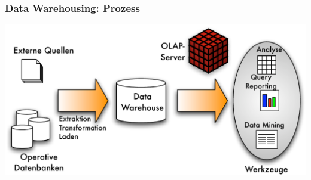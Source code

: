 
\begin{frame}
\frametitle{Data Warehousing: Prozess}

\begin{center}
\includegraphics[scale=.6]{fig1/data-warehousing.pdf}
\end{center}

\end{frame}


